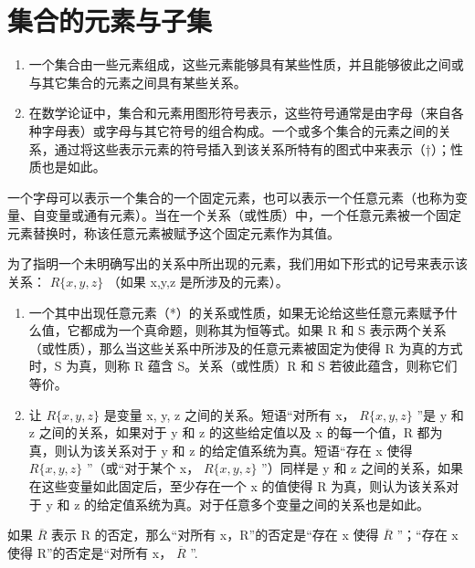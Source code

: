 \section{集合的元素与子集}

\begin{enumerate}
\def\labelenumi{\arabic{enumi}.}
\item
  一个集合由一些元素组成，这些元素能够具有某些性质，并且能够彼此之间或与其它集合的元素之间具有某些关系。
\item
  在数学论证中，集合和元素用图形符号表示，这些符号通常是由字母（来自各种字母表）或字母与其它符号的组合构成。一个或多个集合的元素之间的关系，通过将这些表示元素的符号插入到该关系所特有的图式中来表示（†）；性质也是如此。
\end{enumerate}

一个字母可以表示一个集合的一个固定元素，也可以表示一个任意元素（也称为变量、自变量或通有元素）。当在一个关系（或性质）中，一个任意元素被一个固定元素替换时，称该任意元素被赋予这个固定元素作为其值。

为了指明一个未明确写出的关系中所出现的元素，我们用如下形式的记号来表示该关系： \(R\{x,y,z\}\) （如果 x,y,z 是所涉及的元素）。

\begin{enumerate}
\def\labelenumi{\arabic{enumi}.}
\setcounter{enumi}{2}
\item
  一个其中出现任意元素（*）的关系或性质，如果无论给这些任意元素赋予什么值，它都成为一个真命题，则称其为恒等式。如果 R 和 S 表示两个关系（或性质），那么当这些关系中所涉及的任意元素被固定为使得 R 为真的方式时，S 为真，则称 R 蕴含 S。关系（或性质）R 和 S 若彼此蕴含，则称它们等价。
\item
  让 \(R\{x, y, z\}\) 是变量 x, y, z 之间的关系。短语“对所有 x， \(R\{x, y, z\}\) ”是 y 和 z 之间的关系，如果对于 y 和 z 的这些给定值以及 x 的每一个值，R 都为真，则认为该关系对于 y 和 z 的给定值系统为真。短语“存在 x 使得 \(R\{x, y, z\}\) ”（或“对于某个 x， \(R\{x, y, z\}\) ”）同样是 y 和 z 之间的关系，如果在这些变量如此固定后，至少存在一个 x 的值使得 R 为真，则认为该关系对于 y 和 z 的给定值系统为真。对于任意多个变量之间的关系也是如此。
\end{enumerate}

如果 \(\overline{R}\) 表示 R 的否定，那么“对所有 x，R”的否定是“存在 x 使得 \(\overline{R}\) ”；“存在 x 使得 R”的否定是“对所有 x， \(\overline{R}\) ''.

